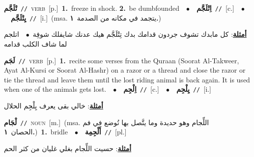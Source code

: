 \documentclass[10pt,a4paper,twoside]{article} %
\begin{document}
\begin{multicols}{2}
{\setlength\topsep{0pt}\textbf{\foreignlanguage{arabic}{تْلَجَّم}}\ {\color{gray}\texttt{//}\color{black}}\ \textsc{verb}\ [p.]\ \textbf{1.}~freeze in shock.  \textbf{2.}~be dumbfounded\ \ $\bullet$\ \ \setlength\topsep{0pt}\textbf{\foreignlanguage{arabic}{اِتْلَجَّم}}\ {\color{gray}\texttt{//}\color{black}}\ [c.]\ \ $\bullet$\ \ \setlength\topsep{0pt}\textbf{\foreignlanguage{arabic}{يِتْلَجَّم}}\ {\color{gray}\texttt{//}\color{black}}\ [i.]\ \color{gray}(msa. \foreignlanguage{arabic}{يتجمد في مكانه من الصدمة}~\foreignlanguage{arabic}{\textbf{١.}})\color{black}\  \begin{flushright}\color{gray}\foreignlanguage{arabic}{\textbf{\underline{\foreignlanguage{arabic}{أمثلة}}}: كل مابدك تشوف جردون قدامك بدك تِتْلَجَّم هيك عدنك شايفلك شوفِة\ $\bullet$\ \  اتلجم لما شاف الكلب قدامه}\end{flushright}\color{black}} \vspace{2mm}

{\setlength\topsep{0pt}\textbf{\foreignlanguage{arabic}{لَجَم}}\ {\color{gray}\texttt{//}\color{black}}\ \textsc{verb}\ [p.]\ \textbf{1.}~recite some verses from the Quraan (Soorat Al-Takweer, Ayat Al-Kursi or Soorat Al-Hashr) on a razor or a thread and close the razor or tie the thread and leave them until the lost riding animal is back again. It is used when one of the animals gets lost.\ \ $\bullet$\ \ \setlength\topsep{0pt}\textbf{\foreignlanguage{arabic}{اِلْجِم}}\ {\color{gray}\texttt{//}\color{black}}\ [c.]\ \ $\bullet$\ \ \setlength\topsep{0pt}\textbf{\foreignlanguage{arabic}{يِلْجِم}}\ {\color{gray}\texttt{//}\color{black}}\ [i.]\  \begin{flushright}\color{gray}\foreignlanguage{arabic}{\textbf{\underline{\foreignlanguage{arabic}{أمثلة}}}: خالي بقى يعرف يِلْجِم الحلال}\end{flushright}\color{black}} \vspace{2mm}

{\setlength\topsep{0pt}\textbf{\foreignlanguage{arabic}{لْجَام}}\ {\color{gray}\texttt{//}\color{black}}\ \textsc{noun}\ [m.]\ \color{gray}(msa. \foreignlanguage{arabic}{اللِّجام وهو حديدة وما يتَّصل بها تُوضع في فم الحصان}~\foreignlanguage{arabic}{\textbf{١.}})\color{black}\ \textbf{1.}~bridle\ \ $\bullet$\ \ \setlength\topsep{0pt}\textbf{\foreignlanguage{arabic}{أَلْجِمِة}}\ {\color{gray}\texttt{//}\color{black}}\ [pl.]\  \begin{flushright}\color{gray}\foreignlanguage{arabic}{\textbf{\underline{\foreignlanguage{arabic}{أمثلة}}}: حسيت اللِّجام بغلي غليان من كثر الحم}\end{flushright}\color{black}} \vspace{2mm}


\end{multicols}
\end{document}
